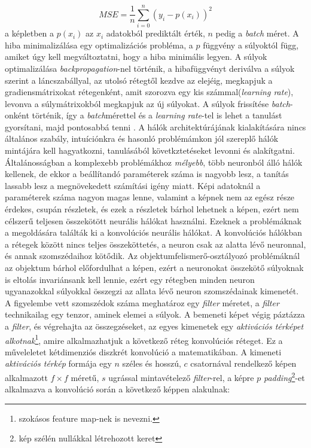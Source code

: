 \documentclass[12pt,letterpaper,oneside,openright]{book}
\begin{document}
\begin{equation}
MSE = \frac{1}{n}\sum^n_{i =0}(y_i -p(x_i))^2
\end{equation}
a képletben a $p(x_i)$ az $x_i$ adatokból prediktált érték, $n$ pedig a \textit{batch} méret. A hiba minimalizálása egy optimalizációs probléma, a $p$ függvény a súlyoktól függ, amiket úgy kell megváltoztatni, hogy a hiba minimális legyen. A súlyok optimalizálása \textit{backpropagation}-nel történik, a hibafüggvényt deriválva a súlyok szerint a láncszabállyal, az utolsó rétegtől kezdve az elejéig, megkapjuk a gradiensmátrixokat rétegenként, amit szorozva egy kis számmal(\textit{learning rate}), levonva a súlymátrixokból megkapjuk az új súlyokat. A súlyok frissítése \textit{batch}-onként történik, így a \textit{batch}mérettel és a \textit{learning rate}-tel is lehet a tanulást gyorsítani, majd pontosabbá tenni \cite{batchs}.
\newline\indent
A hálók architektúrájának kialakítására nincs általános szabály, intuíciónkra és hasonló problémámkon jól szereplő hálók mintájára kell hagyatkozni, tanulásából követkztetéseket levonni és alakítgatni. Általánosságban a komplexebb problémákhoz \textit{mélyebb}, több neuronból álló hálók kellenek, de ekkor a beállítandó paraméterek száma is nagyobb lesz, a tanítás lassabb lesz a megnövekedett számítási igény miatt. Képi adatoknál a paraméterek száma nagyon magas lenne, valamint a képnek nem az egész része érdekes, csupán részletek, és ezek a részletek bárhol lehetnek a képen, ezért nem célszerű teljesen összekötött neurális hálókat használni. Ezeknek a problémáknak a megoldására találták ki a konvolúciós neurális hálókat.
\newline\indent
A konvolúciós hálókban a rétegek között nincs teljes összeköttetés, a neuron csak az alatta lévő neuronnal, és annak szomszédaihoz kötődik. Az objektumfelismerő-osztályozó problémáknál az objektum bárhol előfordulhat a képen, ezért a neuronokat összekötő súlyoknak is eltolás invariánsank kell lennie, ezért egy rétegben minden neuron ugyanazokkal súlyokkal összegzi az allata lévő neuron szomszédainak kimenetét. A figyelembe vett szomszédok száma meghatároz egy \textit{filter} méretet, a \textit{filter} technikailag egy tenzor, aminek elemei a súlyok. A bemeneti képet végig páztázza a \textit{filter}, és végrehajta az összegzéseket, az egyes kimenetek egy \textit{aktivációs térképet alkotnak}\footnote{szokásos feature map-nek is nevezni.}, amire alkalmazhatjuk a következő réteg konvolúciós réteget. Ez a műveleletet kétdimenziós diszkrét konvolúció a matematikában. A kimeneti \textit{aktivációs térkép} formája egy $n$ széles és hosszú, $c$ csatornával rendelkező képen alkalmazott $f\times f$ méretű, $s$ ugrással mintavételező \textit{filter}-rel, a képre $p$ \textit{padding}\footnote{kép szélén nullákkal létrehozott keret}-et alkalmazva a konvolúció során a következő képpen alakulnak:
\end{document}
